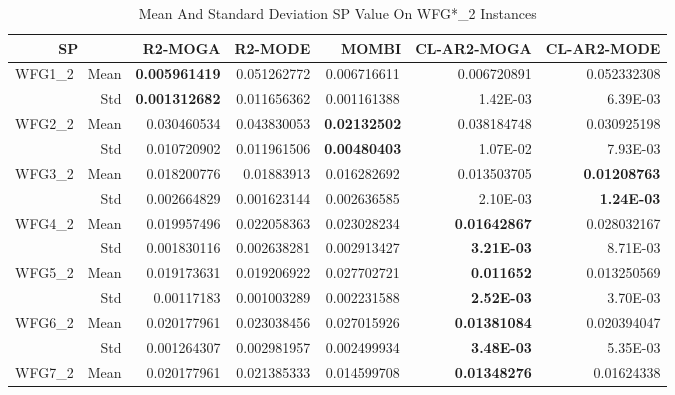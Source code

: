 \begin{table*}[htbp]
  \centering
  \caption{Mean And Standard Deviation SP Value On WFG*\_2 Instances}
    \begin{tabular}{rrrrrrr}
    \toprule
    \multicolumn{2}{c}{SP} & R2-MOGA & R2-MODE & MOMBI & CL-AR2-MOGA & CL-AR2-MODE \\
    \midrule
    \multirow{2}[0]{*}{WFG1\_2} & Mean  & \textbf{0.005961419} & 0.051262772 & \multicolumn{1}{c}{0.006716611} & 0.006720891 & 0.052332308 \\
          & Std   & \textbf{0.001312682} & 0.011656362 & \multicolumn{1}{c}{0.001161388} & 1.42E-03 & 6.39E-03 \\
    \multirow{2}[0]{*}{WFG2\_2} & Mean  & 0.030460534 & 0.043830053 & \multicolumn{1}{c}{\textbf{0.02132502}} & 0.038184748 & 0.030925198 \\
          & Std   & 0.010720902 & 0.011961506 & \multicolumn{1}{c}{\textbf{0.00480403}} & 1.07E-02 & 7.93E-03 \\
    \multirow{2}[0]{*}{WFG3\_2} & Mean  & 0.018200776 & 0.01883913 & \multicolumn{1}{c}{0.016282692} & 0.013503705 & \textbf{0.01208763} \\
          & Std   & 0.002664829 & 0.001623144 & \multicolumn{1}{c}{0.002636585} & 2.10E-03 & \textbf{1.24E-03} \\
    \multirow{2}[0]{*}{WFG4\_2} & Mean  & 0.019957496 & 0.022058363 & \multicolumn{1}{c}{0.023028234} & \textbf{0.01642867} & 0.028032167 \\
          & Std   & 0.001830116 & 0.002638281 & \multicolumn{1}{c}{0.002913427} & \textbf{3.21E-03} & 8.71E-03 \\
    \multirow{2}[0]{*}{WFG5\_2} & Mean  & 0.019173631 & 0.019206922 & \multicolumn{1}{c}{0.027702721} & \textbf{0.011652} & 0.013250569 \\
          & Std   & 0.00117183 & 0.001003289 & \multicolumn{1}{c}{0.002231588} & \textbf{2.52E-03} & 3.70E-03 \\
    \multirow{2}[0]{*}{WFG6\_2} & Mean  & 0.020177961 & 0.023038456 & \multicolumn{1}{c}{0.027015926} & \textbf{0.01381084} & 0.020394047 \\
          & Std   & 0.001264307 & 0.002981957 & \multicolumn{1}{c}{0.002499934} & \textbf{3.48E-03} & 5.35E-03 \\
    \multirow{2}[0]{*}{WFG7\_2} & Mean  & 0.020177961 & 0.021385333 & \multicolumn{1}{c}{0.014599708} & \textbf{0.01348276} & 0.01624338 \\

\end{tabular}
\end{table*}
